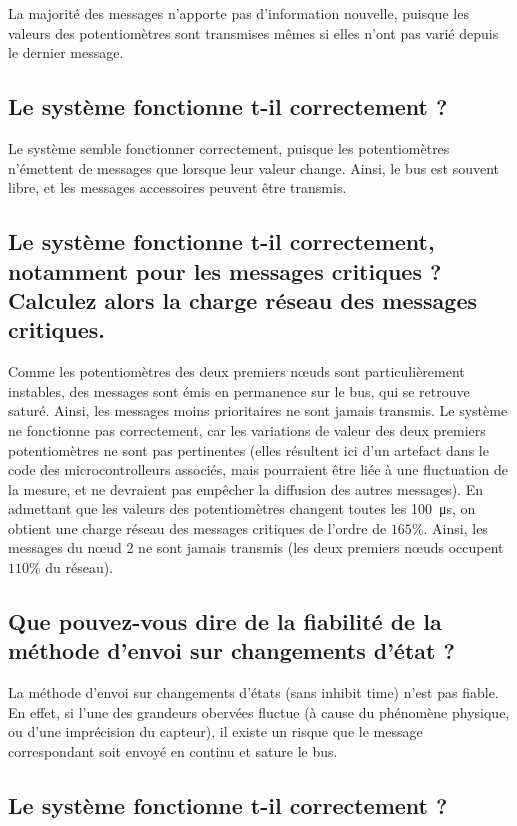 \documentclass[12pt]{article}
\begin{document}
La majorité des messages n'apporte pas d'information nouvelle, puisque les valeurs des potentiomètres sont transmises mêmes si elles n'ont pas varié depuis le dernier message.

\subsection{Le système fonctionne t-il correctement ?}

Le système semble fonctionner correctement, puisque les potentiomètres n'émettent de messages que lorsque leur valeur change. Ainsi, le bus est souvent libre, et les messages accessoires peuvent être transmis.

\subsection{Le système fonctionne t-il correctement, notamment pour les messages critiques ? Calculez alors la charge réseau des messages critiques.}

Comme les potentiomètres des deux premiers nœuds sont particulièrement instables, des messages sont émis en permanence sur le bus, qui se retrouve saturé. Ainsi, les messages moins prioritaires ne sont jamais transmis. Le système ne fonctionne pas correctement, car les variations de valeur des deux premiers potentiomètres ne sont pas pertinentes (elles résultent ici d'un artefact dans le code des microcontrolleurs associés, mais pourraient être liée à une fluctuation de la mesure, et ne devraient pas empêcher la diffusion des autres messages). En admettant que les valeurs des potentiomètres changent toutes les \SI{100}{\micro\second}, on obtient une charge réseau des messages critiques de l'ordre de $165\%$. Ainsi, les messages du nœud 2 ne sont jamais transmis (les deux premiers nœuds occupent $110\%$ du réseau).

\subsection{Que pouvez-vous dire de la fiabilité de la méthode d'envoi sur changements d'état ?}

La méthode d'envoi sur changements d'états (sans inhibit time) n'est pas fiable. En effet, si l'une des grandeurs obervées fluctue (à cause du phénomène physique, ou d'une imprécision du capteur), il existe un risque que le message correspondant soit envoyé en continu et sature le bus.

\subsection{Le système fonctionne t-il correctement ?}
\end{document}
